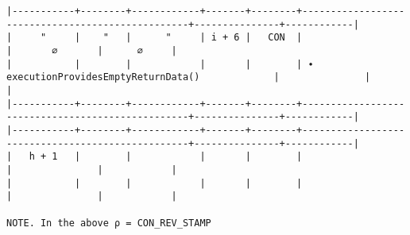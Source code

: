 \documentclass[varwidth=\maxdimen,margin=0.5cm,multi={verbatim}]{standalone}
\begin{document}
\begin{verbatim}
|-----------+--------+------------+-------+--------+--------------------------------------------------+---------------+------------|
|     "     |    "   |      "     | i + 6 |   CON  |                                                  |       ∅       |      ∅     |
|           |        |            |       |        | ∙ executionProvidesEmptyReturnData()             |               |            |
|-----------+--------+------------+-------+--------+--------------------------------------------------+---------------+------------|
|-----------+--------+------------+-------+--------+--------------------------------------------------+---------------+------------|
|   h + 1   |        |            |       |        |                                                  |               |            |
|           |        |            |       |        |                                                  |               |            |

NOTE. In the above ρ = CON_REV_STAMP
\end{verbatim}
\end{document}
